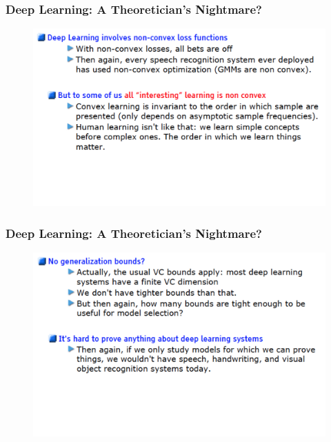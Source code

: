 \documentclass{beamer}
\begin{document}
\begin{frame}
\frametitle{Deep Learning: A Theoretician's Nightmare?}
\begin{figure}
      \includegraphics[width=1\textwidth]{figs/intro11.png}
\end{figure}
\end{frame}

\begin{frame}
\frametitle{Deep Learning: A Theoretician's Nightmare?}
\begin{figure}
      \includegraphics[width=1\textwidth]{figs/intro12.png}
\end{figure}
\end{frame}
\end{document}

